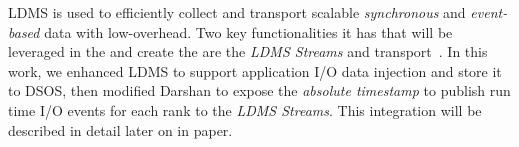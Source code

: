 

LDMS is used to efficiently collect and transport scalable \emph{synchronous} and \emph{event-based} data with low-overhead. Two key functionalities it has that will be leveraged in the \Darshan and create the \connector are the \emph{LDMS Streams} and transport~\cite{ldmsgithub}. In this work, we enhanced LDMS to support application I/O data injection and store it to DSOS, then modified Darshan to expose the \emph{absolute timestamp} to publish run time I/O events for each rank to the \emph{LDMS Streams}. This integration will be described in detail later on in paper.   




